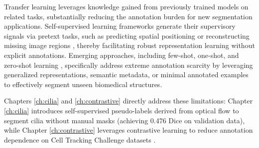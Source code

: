 \documentclass[./dissertation.tex]{subfiles}
\begin{document}
Transfer learning leverages knowledge gained from previously trained models on related tasks, substantially reducing the annotation burden for new segmentation applications. Self-supervised learning frameworks generate their supervisory signals via pretext tasks, such as predicting spatial positioning or reconstructing missing image regions \cite{chen2020simple}, thereby facilitating robust representation learning without explicit annotations. Emerging approaches, including few-shot, one-shot, and zero-shot learning \cite{zhao2023one}, specifically address extreme annotation scarcity by leveraging generalized representations, semantic metadata, or minimal annotated examples to effectively segment unseen biomedical structures.

Chapters \ref{ch:cilia} and \ref{ch:contrastive} directly address these limitations: Chapter \ref{ch:cilia} introduces self-supervised pseudo-labels derived from optical flow to segment cilia without manual masks (achieving 0.476 Dice on validation data), while Chapter \ref{ch:contrastive} leverages contrastive learning to reduce annotation dependence on Cell Tracking Challenge datasets \cite{mavska2023cell}.

\end{document}
